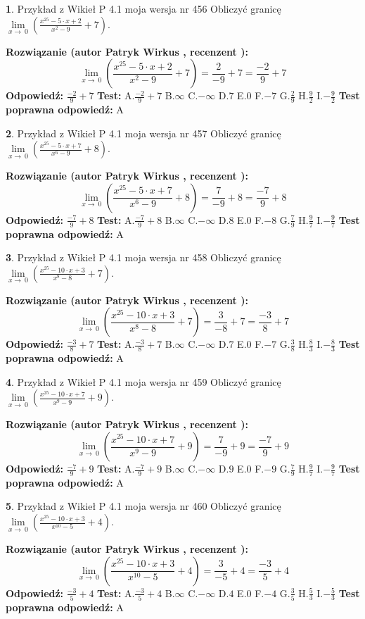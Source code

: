 \documentclass[12pt, a4paper]{article}
\theoremstyle{definition} %
\newtheorem{zad}{}
\newcommand{\zadStart}[1]{\begin{zad}#1\newline}
\newcommand{\zadStop}{\end{zad}}
\newcommand{\rozwStart}[2]{\noindent \textbf{Rozwiązanie (autor #1 , recenzent #2): }\newline}
\newcommand{\rozwStop}{\newline}
\newcommand{\odpStart}{\noindent \textbf{Odpowiedź:}\newline}
\newcommand{\odpStop}{\newline}
\newcommand{\testStart}{\noindent \textbf{Test:}\newline}
\newcommand{\testStop}{\newline}
\newcommand{\kluczStart}{\noindent \textbf{Test poprawna odpowiedź:}\newline}
\newcommand{\kluczStop}{\newline}
\begin{document}
\zadStart{Przykład z Wikieł P 4.1 moja wersja nr 456}
Obliczyć granicę $\lim\limits_{x\to\ 0}(\frac{x^{25}-5 \cdot x +2}{x^{2}-9}+7)$.
\zadStop
\rozwStart{Patryk Wirkus}{}
$$\lim\limits_{x\to\ 0}(\frac{x^{25}-5 \cdot x +2}{x^{2}-9}+7)=\frac{2}{-9}+7=\frac{-2}{9}+7$$
\rozwStop
\odpStart
$\frac{-2}{9}+7$
\odpStop
\testStart
A.$\frac{-2}{9}+7$
B.$\infty$
C.$-\infty$
D.$7$
E.$0$
F.$-7$
G.$\frac{2}{9}$
H.$\frac{9}{2}$
I.$-\frac{9}{2}$
\testStop
\kluczStart
A
\kluczStop



\zadStart{Przykład z Wikieł P 4.1 moja wersja nr 457}
Obliczyć granicę $\lim\limits_{x\to\ 0}(\frac{x^{25}-5 \cdot x +7}{x^{6}-9}+8)$.
\zadStop
\rozwStart{Patryk Wirkus}{}
$$\lim\limits_{x\to\ 0}(\frac{x^{25}-5 \cdot x +7}{x^{6}-9}+8)=\frac{7}{-9}+8=\frac{-7}{9}+8$$
\rozwStop
\odpStart
$\frac{-7}{9}+8$
\odpStop
\testStart
A.$\frac{-7}{9}+8$
B.$\infty$
C.$-\infty$
D.$8$
E.$0$
F.$-8$
G.$\frac{7}{9}$
H.$\frac{9}{7}$
I.$-\frac{9}{7}$
\testStop
\kluczStart
A
\kluczStop



\zadStart{Przykład z Wikieł P 4.1 moja wersja nr 458}
Obliczyć granicę $\lim\limits_{x\to\ 0}(\frac{x^{25}-10 \cdot x +3}{x^{8}-8}+7)$.
\zadStop
\rozwStart{Patryk Wirkus}{}
$$\lim\limits_{x\to\ 0}(\frac{x^{25}-10 \cdot x +3}{x^{8}-8}+7)=\frac{3}{-8}+7=\frac{-3}{8}+7$$
\rozwStop
\odpStart
$\frac{-3}{8}+7$
\odpStop
\testStart
A.$\frac{-3}{8}+7$
B.$\infty$
C.$-\infty$
D.$7$
E.$0$
F.$-7$
G.$\frac{3}{8}$
H.$\frac{8}{3}$
I.$-\frac{8}{3}$
\testStop
\kluczStart
A
\kluczStop



\zadStart{Przykład z Wikieł P 4.1 moja wersja nr 459}
Obliczyć granicę $\lim\limits_{x\to\ 0}(\frac{x^{25}-10 \cdot x +7}{x^{9}-9}+9)$.
\zadStop
\rozwStart{Patryk Wirkus}{}
$$\lim\limits_{x\to\ 0}(\frac{x^{25}-10 \cdot x +7}{x^{9}-9}+9)=\frac{7}{-9}+9=\frac{-7}{9}+9$$
\rozwStop
\odpStart
$\frac{-7}{9}+9$
\odpStop
\testStart
A.$\frac{-7}{9}+9$
B.$\infty$
C.$-\infty$
D.$9$
E.$0$
F.$-9$
G.$\frac{7}{9}$
H.$\frac{9}{7}$
I.$-\frac{9}{7}$
\testStop
\kluczStart
A
\kluczStop



\zadStart{Przykład z Wikieł P 4.1 moja wersja nr 460}
Obliczyć granicę $\lim\limits_{x\to\ 0}(\frac{x^{25}-10 \cdot x +3}{x^{10}-5}+4)$.
\zadStop
\rozwStart{Patryk Wirkus}{}
$$\lim\limits_{x\to\ 0}(\frac{x^{25}-10 \cdot x +3}{x^{10}-5}+4)=\frac{3}{-5}+4=\frac{-3}{5}+4$$
\rozwStop
\odpStart
$\frac{-3}{5}+4$
\odpStop
\testStart
A.$\frac{-3}{5}+4$
B.$\infty$
C.$-\infty$
D.$4$
E.$0$
F.$-4$
G.$\frac{3}{5}$
H.$\frac{5}{3}$
I.$-\frac{5}{3}$
\testStop
\kluczStart
A
\kluczStop
\end{document}
